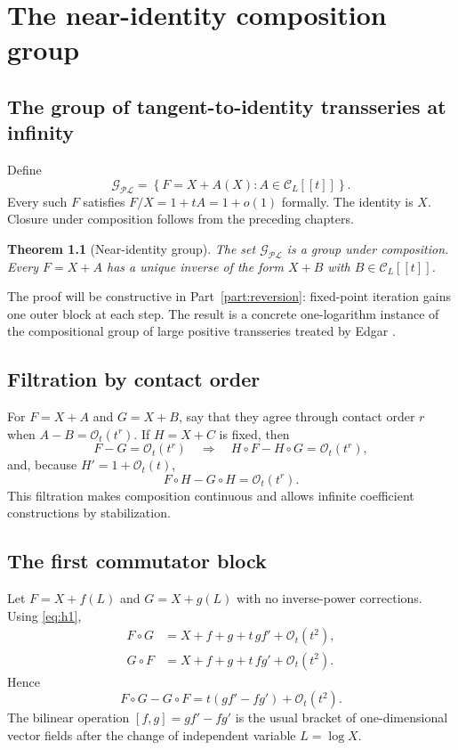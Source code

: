 \documentclass[11pt,oneside]{book}
\newtheorem{theorem}{Theorem}[chapter]
\theoremstyle{definition}
\theoremstyle{remark}
\newcommand{\PL}{\mathscr{PL}}
\newcommand{\bigO}{\mathcal O}
\newcommand{\compose}{\mathbin{\circ}}
\begin{document}
\chapter{The near-identity composition group}
\label{ch:composition-group}

\section{The group of tangent-to-identity transseries at infinity}
Define
\begin{equation}\label{eq:near-id-group}
 \mathcal G_{\PL}
 =\left\{F=X+A(X):A\in\mathcal C_L[[t]]\right\}.
\end{equation}
Every such $F$ satisfies $F/X=1+tA=1+o(1)$ formally.  The identity is $X$.
Closure under composition follows from the preceding chapters.

\begin{theorem}[Near-identity group]\label{thm:near-id-group}
The set $\mathcal G_{\PL}$ is a group under composition.  Every
$F=X+A$ has a unique inverse of the form $X+B$ with
$B\in\mathcal C_L[[t]]$.
\end{theorem}
The proof will be constructive in Part~\ref{part:reversion}: fixed-point
iteration gains one outer block at each step.  The result is a concrete
one-logarithm instance of the compositional group of large positive
transseries treated by Edgar \cite{EdgarComposition}.

\section{Filtration by contact order}
For $F=X+A$ and $G=X+B$, say that they agree through contact order $r$ when
$A-B=\bigO_t(t^r)$.  If $H=X+C$ is fixed, then
\begin{equation}\label{eq:composition-continuity-left}
 F-G=\bigO_t(t^r)
 \quad\Longrightarrow\quad
 H\compose F-H\compose G=\bigO_t(t^r),
\end{equation}
and, because $H'=1+\bigO_t(t)$,
\begin{equation}\label{eq:composition-continuity-right}
 F\compose H-G\compose H=\bigO_t(t^r).
\end{equation}
This filtration makes composition continuous and allows infinite coefficient
constructions by stabilization.

\section{The first commutator block}
Let $F=X+f(L)$ and $G=X+g(L)$ with no inverse-power corrections.  Using
\eqref{eq:h1},
\begin{align*}
 F\compose G&=X+f+g+t\,g f'+\bigO_t(t^2),\\
 G\compose F&=X+f+g+t\,f g'+\bigO_t(t^2).
\end{align*}
Hence
\begin{equation}\label{eq:first-commutator}
 F\compose G-G\compose F
 =t(gf'-fg')+\bigO_t(t^2).
\end{equation}
The bilinear operation $[f,g]=gf'-fg'$ is the usual bracket of one-dimensional
vector fields after the change of independent variable $L=\log X$.
\end{document}
